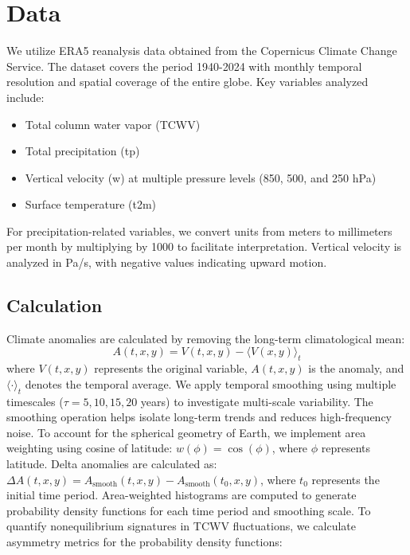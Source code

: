 \documentclass{article}
\begin{document}
\section{Data}\label{data}

We utilize ERA5 reanalysis data obtained from the Copernicus Climate
Change Service. The dataset covers the period 1940-2024 with monthly
temporal resolution and spatial coverage of the entire globe. Key
variables analyzed include:

\begin{itemize}
\item
  Total column water vapor (TCWV)
\item
  Total precipitation (tp)
\item
  Vertical velocity (w) at multiple pressure levels (850, 500, and 250
  hPa)
\item
  Surface temperature (t2m)
\end{itemize}

For precipitation-related variables, we convert units from meters to
millimeters per month by multiplying by 1000 to facilitate
interpretation. Vertical velocity is analyzed in Pa/s, with negative
values indicating upward motion.

\subsection{Calculation}\label{anomaly-calculation}

Climate anomalies are calculated by removing the long-term
climatological mean: \[A(t,x,y) = V(t,x,y) - \langle V(x,y)\rangle_{t}\]
where \(V(t,x,y)\) represents the original variable, \(A(t,x,y)\) is the
anomaly, and \(\langle \cdot \rangle_{t}\) denotes the temporal average.
\protect{}\label{temporal-smoothing}{} We apply temporal
smoothing using multiple timescales (\(\tau = 5,10,15,20\) years) to
investigate multi-scale variability. The smoothing operation helps
isolate long-term trends and reduces high-frequency noise.
\protect{}\label{area-weighted-probability-density-function-analysis}{}
To account for the spherical geometry of Earth, we implement area
weighting using cosine of latitude: \(w(\phi) = \cos(\phi)\), where
\(\phi\) represents latitude. Delta anomalies are calculated as:
\(\Delta A(t,x,y) = A_{\mathrm{\text{smooth}}}(t,x,y) - A_{\mathrm{\text{smooth}}}(t_{0},x,y)\),
where \(t_{0}\) represents the initial time period. Area-weighted
histograms are computed to generate probability density functions for
each time period and smoothing scale.
\protect{}\label{asymmetry-analysis}{} To quantify
nonequilibrium signatures in TCWV fluctuations, we calculate asymmetry
metrics for the probability density functions:
\end{document}
